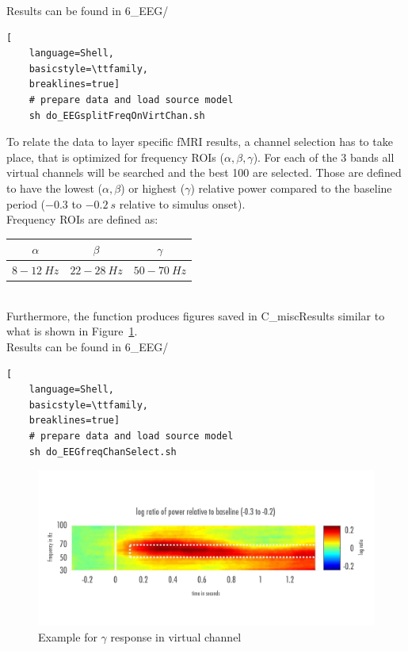 \documentclass[12pt,a4paper]{scrartcl}
\begin{document}
\noindent Results can be found in 6\_EEG/\\
\begin{lstlisting}[
    language=Shell,
    basicstyle=\ttfamily,
    breaklines=true]
    # prepare data and load source model
    sh do_EEGsplitFreqOnVirtChan.sh
\end{lstlisting}
To relate the data to layer specific fMRI results, a channel selection has to take place, that is optimized for frequency ROIs ($\alpha, \beta, \gamma$). For each of the 3 bands all virtual channels will be searched and the best 100 are selected. Those are defined to have the lowest ($\alpha, \beta$) or highest ($\gamma$) relative power compared to the baseline period ($-0.3$ to $-0.2~s$ relative to simulus onset).\\

\noindent Frequency ROIs are defined as:
\begin{table}[h]
\begin{tabular}{c | c | c}
\toprule
$\alpha$ & $\beta$ & $\gamma$\\\toprule
$8-12~Hz$ & $22-28~Hz$ & $50-70~Hz$ \\\bottomrule
\end{tabular}
\end{table}\\
Furthermore, the function produces figures saved in C\_miscResults similar to what is shown in Figure~\ref{fig:exampleGamma}.\\

\noindent Results can be found in 6\_EEG/\\
\begin{lstlisting}[
    language=Shell,
    basicstyle=\ttfamily,
    breaklines=true]
    # prepare data and load source model
    sh do_EEGfreqChanSelect.sh
\end{lstlisting}
\begin{figure}
\begin{center}
\includegraphics[width=1\textwidth]{exampleGamma}
\caption[Example for $\gamma$ response in virtual channel]{Example for $\gamma$ response in virtual channel}
\label{fig:exampleGamma}
\end{center}
\end{figure}
\FloatBarrier
\end{document}
